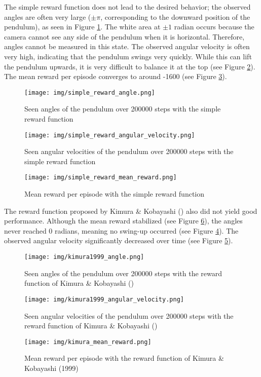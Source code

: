 The simple reward function does not lead to the desired behavior; the observed angles are often very large ($\pm\pi$, corresponding to the downward position of the pendulum), as seen in Figure \ref{fig:angle_simple_reward}. The white area at $\pm 1$ radian occurs because the camera cannot see any side of the pendulum when it is horizontal. Therefore, angles cannot be measured in this state. The observed angular velocity is often very high, indicating that the pendulum swings very quickly. While this can lift the pendulum upwards, it is very difficult to balance it at the top (see Figure \ref{fig:angle_velocity_simple_reward}). The mean reward per episode converges to around -1600 (see Figure \ref{fig:mean_reward_simple_reward}).
\begin{figure}[htbp]
    \centering
    \texttt{[image: img/simple\_reward\_angle.png]}
    \caption{Seen angles of the pendulum over 200000 steps with the simple reward function}
    \label{fig:angle_simple_reward}
\end{figure}
\begin{figure}[htbp]
    \centering
    \texttt{[image: img/simple\_reward\_angular\_velocity.png]}
    \caption{Seen angular velocities of the pendulum over 200000 steps with the simple reward function}
    \label{fig:angle_velocity_simple_reward}
\end{figure}
\begin{figure}[htbp]
    \centering
    \texttt{[image: img/simple\_reward\_mean\_reward.png]}
    \caption{Mean reward per episode with the simple reward function}
    \label{fig:mean_reward_simple_reward}
\end{figure}

The reward function proposed by Kimura \& Kobayashi (\citeyear{kimura_stochastic_1999}) also did not yield good performance. Although the mean reward stabilized (see Figure \ref{fig:mean_reward_kimura1999}), the angles never reached 0 radians, meaning no swing-up occurred (see Figure \ref{fig:angle_kimura1999}). The observed angular velocity significantly decreased over time (see Figure \ref{fig:angle_velocity_kimura1999}).
\begin{figure}[htbp]
    \centering
    \texttt{[image: img/kimura1999\_angle.png]}
    \caption{Seen angles of the pendulum over 200000 steps with the reward function of Kimura \& Kobayashi (\citeyear{kimura_stochastic_1999})}
    \label{fig:angle_kimura1999}
\end{figure}
\begin{figure}[htbp]
    \centering
    \texttt{[image: img/kimura1999\_angular\_velocity.png]}
    \caption{Seen angular velocities of the pendulum over 200000 steps with the reward function of Kimura \& Kobayashi (\citeyear{kimura_stochastic_1999})}
    \label{fig:angle_velocity_kimura1999}
\end{figure}
\begin{figure}[htbp]
    \centering
    \texttt{[image: img/kimura\_mean\_reward.png]}
    \caption{Mean reward per episode with the reward function of Kimura \& Kobayashi (19\citeyear{kimura_stochastic_1999}99)}
    \label{fig:mean_reward_kimura1999}
\end{figure}

